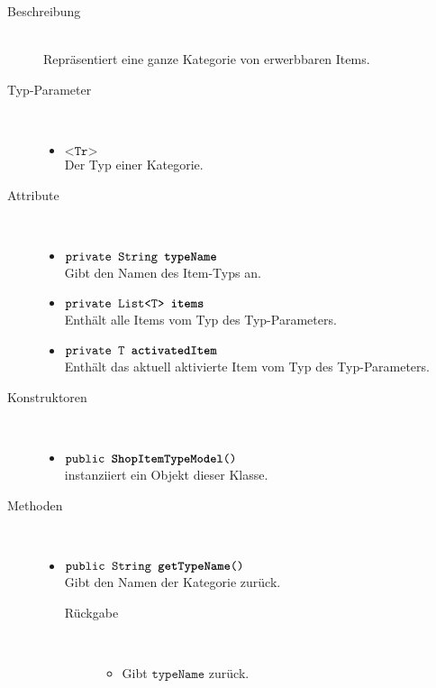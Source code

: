 \begin{description}
\item[Beschreibung] \hfill \\ Repräsentiert eine ganze Kategorie von erwerbbaren Items.

\item[Typ-Parameter] \hfill \\
	\vspace{-.8cm}
	\begin{itemize}
		\item $\texttt{<Tr>}$ \\ Der Typ einer Kategorie.
	\end{itemize}

\item[Attribute] \hfill \\
	\vspace{-.8cm}
	\begin{itemize}
		\item $\texttt{private String \textbf{typeName}}$ \\ Gibt den Namen des Item-Typs an.
		\item $\texttt{private List<T> \textbf{items}}$ \\ Enthält alle Items vom Typ des Typ-Parameters.
		\item $\texttt{private T \textbf{activatedItem}}$ \\ Enthält das aktuell aktivierte Item vom Typ des Typ-Parameters.
		\end{itemize}
	
\item[Konstruktoren] \hfill \\
	\vspace{-.8cm}
	\begin{itemize}
		\item $\texttt{public \textbf{ShopItemTypeModel}()}$ \\ instanziiert ein Objekt dieser Klasse.

	\end{itemize}
	
\item[Methoden] \hfill \\
	\vspace{-.8cm}
	\begin{itemize}
		\item $\texttt{public String \textbf{getTypeName}()}$ \\ Gibt den Namen der Kategorie zurück.
		\begin{description}
			\item[Rückgabe] \hfill \\
			\vspace{-.8cm}
			\begin{itemize}
				\item Gibt $\texttt{typeName}$ zurück.
			\end{itemize}
			\end{description}
		

\end{itemize}
\end{description}
